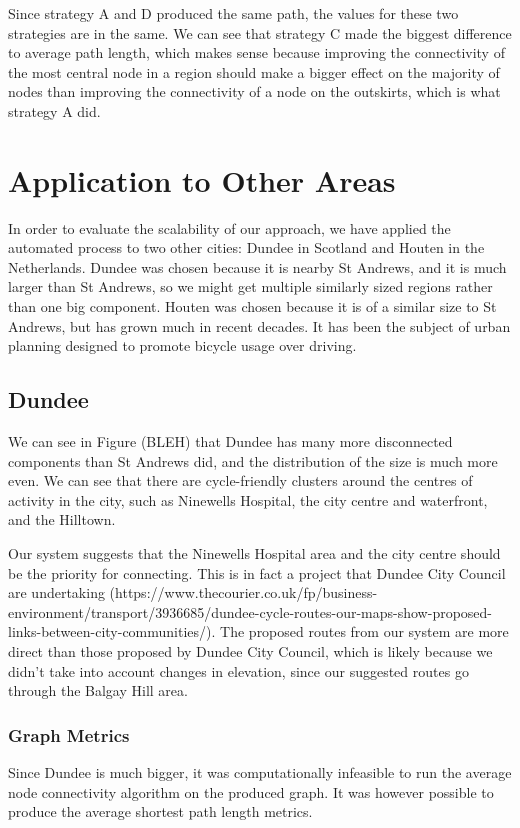 \documentclass[12pt,a4paper]{report}
\begin{document}
Since strategy A and D produced the same path, the values for these two strategies are in the same. We can see that strategy C made the biggest difference to average path length, which makes sense because improving the connectivity of the most central node in a region should make a bigger effect on the majority of nodes than improving the connectivity of a node on the outskirts, which is what strategy A did.

\section{Application to Other Areas}
In order to evaluate the scalability of our approach, we have applied the automated process to two other cities: Dundee in Scotland and Houten in the Netherlands. Dundee was chosen because it is nearby St Andrews, and it is much larger than St Andrews, so we might get multiple similarly sized regions rather than one big component. Houten was chosen because it is of a similar size to St Andrews, but has grown much in recent decades. It has been the subject of urban planning designed to promote bicycle usage over driving.

\subsection{Dundee}
We can see in Figure (BLEH) that Dundee has many more disconnected components than St Andrews did, and the distribution of the size is much more even. We can see that there are cycle-friendly clusters around the centres of activity in the city, such as Ninewells Hospital, the city centre and waterfront, and the Hilltown.

Our system suggests that the Ninewells Hospital area and the city centre should be the priority for connecting. This is in fact a project that Dundee City Council are undertaking (https://www.thecourier.co.uk/fp/business-environment/transport/3936685/dundee-cycle-routes-our-maps-show-proposed-links-between-city-communities/). The proposed routes from our system are more direct than those proposed by Dundee City Council, which is likely because we didn't take into account changes in elevation, since our suggested routes go through the Balgay Hill area.

\subsubsection*{Graph Metrics}
Since Dundee is much bigger, it was computationally infeasible to run the average node connectivity algorithm on the produced graph. It was however possible to produce the average shortest path length metrics. 
\end{document}
